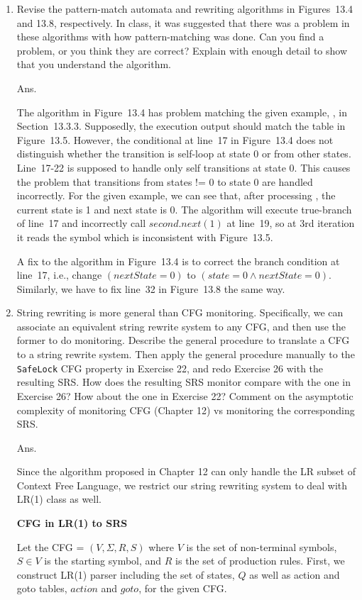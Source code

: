 \documentclass{article}
\begin{document}
\begin{enumerate}
\item Revise the pattern-match automata and rewriting algorithms in Figures~13.4
and 13.8, respectively.
In class, it was suggested that there was a problem in these algorithms with how
pattern-matching was done.
Can you find a problem, or you think they are correct?
Explain with enough detail to show that you understand the algorithm.

Ans.

The algorithm in Figure~13.4 has problem matching the given example,
\BEGIN \BEGIN \ACQ \BEGIN \END, in Section~13.3.3.
Supposedly, the execution output should match the table in Figure~13.5.
However, the conditional at line~17 in Figure~13.4 does not distinguish whether
the transition is self-loop at state 0 or from other states.
Line~17-22 is supposed to handle only self transitions at state 0.
This causes the problem that transitions from states != 0 to state 0 are handled
incorrectly.
For the given example, we can see that, after processing \BEGIN \BEGIN,
the current state is 1 and next state is 0.
The algorithm will execute true-branch of line~17 and incorrectly call
$second.next(1)$ at line~19,
so at 3rd iteration it reads the symbol \ACQ which is inconsistent with Figure~13.5.

A fix to the algorithm in Figure~13.4 is to correct the branch condition at line~17,
i.e., change $(nextState = 0)$ to $(state =0 \land nextState = 0)$.
Similarly, we have to fix line~32 in Figure~13.8 the same way.

\item String rewriting is more general than CFG monitoring.
Specifically, we can associate an equivalent string rewrite system to any CFG,
and then use the former to do monitoring. 
Describe the general procedure to translate a CFG to a string rewrite system.
Then apply the general procedure manually to the \texttt{SafeLock} CFG property
in Exercise 22,
and redo Exercise 26 with the resulting SRS.
How does the resulting SRS monitor compare with the one in Exercise 26?
How about the one in Exercise 22?
Comment on the asymptotic complexity of monitoring CFG (Chapter 12) vs monitoring
the corresponding SRS.

Ans.

Since the algorithm proposed in Chapter 12 can only handle the LR subset of
Context Free Language, we restrict our string rewriting system to deal with LR(1)
class as well.

\textbf{CFG in LR(1) to SRS}

Let the CFG = $(V, \Sigma, R, S)$ where $V$ is the set of non-terminal symbols,
$S \in V$ is the starting symbol, and $R$ is the set of production rules.
First, we construct LR(1) parser including the set of states, $Q$ as well as
action and goto tables, $action$ and $goto$, for the given CFG.


\end{enumerate}
\end{document}
